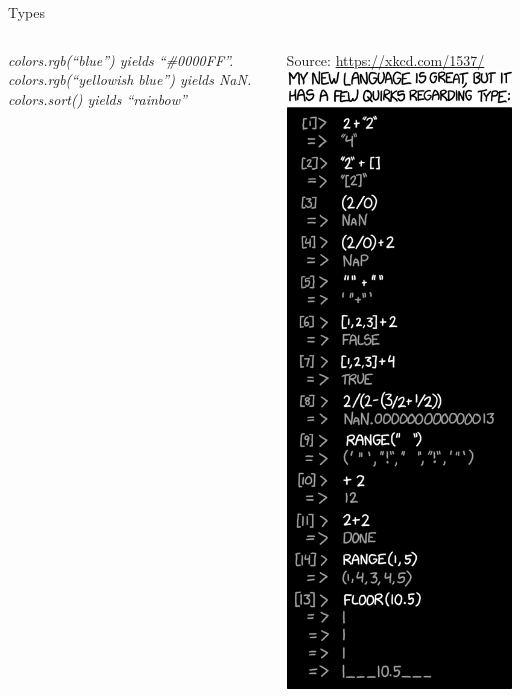 \begin{frame}{Types}
%
\begin{columns}
\vspace{12pt}
\emph{colors.rgb(\enquote{blue}) yields \enquote{\#0000FF}. colors.rgb(\enquote{yellowish blue}) yields NaN. colors.sort() yields \enquote{rainbow}}

\vspace{12pt}
Source: \url{https://xkcd.com/1537/}
%
\includegraphics[width=.8\linewidth]{./gfx/15-xkcd-types}
\end{columns}
\end{frame}

